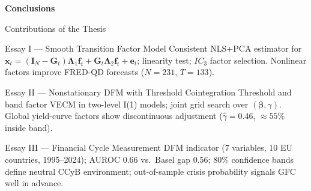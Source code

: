 \documentclass{beamer}
\begin{document}
\begin{frame}{}
  \begin{center}
    \Large\textcolor{isegblue}{\textbf{Conclusions}}
  \end{center}
\end{frame}

\begin{frame}{Contributions of the Thesis}

\begin{block}{Essay I --- Smooth Transition Factor Model}
  Consistent NLS+PCA estimator for $\boldsymbol{x}_t=(\boldsymbol{I}_N-\boldsymbol{G}_t)\boldsymbol{\Lambda}_1\boldsymbol{f}_t+\boldsymbol{G}_t\boldsymbol{\Lambda}_2\boldsymbol{f}_t+\boldsymbol{e}_t$; linearity test; $IC_3$ factor selection. Nonlinear factors improve FRED-QD forecasts ($N=231$, $T=133$).
\end{block}

\vspace{0.3em}

\begin{block}{Essay II --- Nonstationary DFM with Threshold Cointegration}
  Threshold and band factor VECM in two-level I(1) models; joint grid search over $(\boldsymbol{\beta},\gamma)$. Global yield-curve factors show discontinuous adjustment ($\hat{\gamma}=0.46$, $\approx55\%$ inside band).
\end{block}

\vspace{0.3em}

\begin{block}{Essay III --- Financial Cycle Measurement}
  DFM indicator (7 variables, 10 EU countries, 1995--2024); AUROC 0.66 vs.\ Basel gap 0.56; 80\% confidence bands define neutral CCyB environment; out-of-sample crisis probability signals GFC well in advance.
\end{block}

\end{frame}
\end{document}
